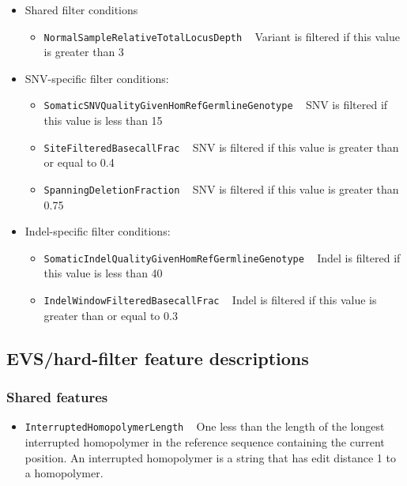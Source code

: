 \documentclass{article}
\begin{document}
\begin{itemize}
    \item Shared filter conditions
    \begin{itemize}
        \item \texttt{NormalSampleRelativeTotalLocusDepth} ~ Variant is filtered if this value is greater than 3
    \end{itemize}
    \item SNV-specific filter conditions:
    \begin{itemize}
        \item \texttt{SomaticSNVQualityGivenHomRefGermlineGenotype} ~ SNV is filtered if this value is less than 15
        \item \texttt{SiteFilteredBasecallFrac} ~ SNV is filtered if this value is greater than or equal to 0.4
        \item \texttt{SpanningDeletionFraction} ~ SNV is filtered if this value is greater than 0.75
    \end{itemize}
    \item Indel-specific filter conditions:
    \begin{itemize}
        \item \texttt{SomaticIndelQualityGivenHomRefGermlineGenotype} ~ Indel is filtered if this value is less than 40
        \item \texttt{IndelWindowFilteredBasecallFrac} ~ Indel is filtered if this value is greater than or equal to 0.3
    \end{itemize}
\end{itemize}


\subsection{EVS/hard-filter feature descriptions}

\subsubsection{Shared features}
\begin{itemize}

    \item \texttt{InterruptedHomopolymerLength} ~ One less than the length of the longest interrupted homopolymer in the reference sequence containing the current position. An interrupted homopolymer is a string that has edit distance 1 to a homopolymer.

\end{itemize}
\end{document}
